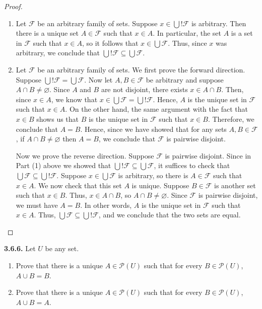 \documentclass[12pt]{amsart}
\newenvironment{statement}[1]{\smallskip\noindent\color[rgb]{.6627, .3529, .6314} {\bf #1.}}{}
\theoremstyle{definition}
\theoremstyle{remark}
\newcommand{\powerset}[1]{\mathscr{P} \left( #1 \right)}
\begin{document}
\begin{proof}
\hfill
\begin{enumerate}
	\item Let $\mathcal{F}$ be an arbitrary family of sets.
	Suppose $x \in \bigcup ! \mathcal{F}$ is arbitrary.
	Then there is a unique set $A \in \mathcal{F}$ such that $x \in A$.
	In particular, the set $A$ is a set in $\mathcal{F}$ such that $x \in A$, so it follows that
	$x \in \bigcup \mathcal{F}$.
	Thus, since $x$ was arbitrary, we conclude that 
	$\bigcup ! \mathcal{F} \subseteq \bigcup \mathcal{F}$.
	
	\item Let $\mathcal{F}$ be an arbitrary family of sets.
	We first prove the forward direction.
	Suppose $\bigcup ! \mathcal{F} = \bigcup \mathcal{F}$.
	Now let $A, B \in \mathcal{F}$ be arbitrary and suppose $A \cap B \neq \varnothing$.
	Since $A$ and $B$ are not disjoint, there exists $x \in A \cap B$.
	Then, since $x \in A$, we know that $x \in \bigcup \mathcal{F} = \bigcup ! \mathcal{F}$.
	Hence, $A$ is the unique set in $\mathcal{F}$ such that $x \in A$.
	On the other hand, the same argument with the fact that $x \in B$ shows us that $B$ is the
	unique set in $\mathcal{F}$ such that $x \in B$.
	Therefore, we conclude that $A = B$.
	Hence, since we have showed that for any sets $A, B \in \mathcal{F}$, if $A \cap B \neq \varnothing$
	then $A = B$, we conclude that $\mathcal{F}$ is pairwise disjoint.
	
	Now we prove the reverse direction.
	Suppose $\mathcal{F}$ is pairwise disjoint.
	Since in Part (1) above we showed that $\bigcup ! \mathcal{F} \subseteq \bigcup \mathcal{F}$,
	it suffices to check that $\bigcup \mathcal{F} \subseteq \bigcup ! \mathcal{F}$.
	Suppose $x \in \bigcup \mathcal{F}$ is arbitrary, so there is $A \in \mathcal{F}$ such that $x \in A$.
	We now check that this set $A$ is unique.
	Suppose $B \in \mathcal{F}$ is another set such that $x \in B$.
	Thus, $x \in A \cap B$, so $A \cap B \neq \varnothing$.
	Since $\mathcal{F}$ is pairwise disjoint, we must have $A = B$.
	In other words, $A$ is the unique set in $\mathcal{F}$ such that $x \in A$.
	Thus, $\bigcup \mathcal{F} \subseteq \bigcup ! \mathcal{F}$, and we conclude that the
	two sets are equal.
\end{enumerate}
\end{proof}


\begin{statement}{3.6.6}
Let $U$ be any set.
\begin{enumerate}
	\item Prove that there is a unique $A \in \powerset{U}$ such that for every $B \in \powerset{U}$,
	$A \cup B = B$.
	
	\item Prove that there is a unique $A \in \powerset{U}$ such that for every $B \in \powerset{U}$,
	$A \cup B = A$.
\end{enumerate}
\end{statement}
\end{document}
